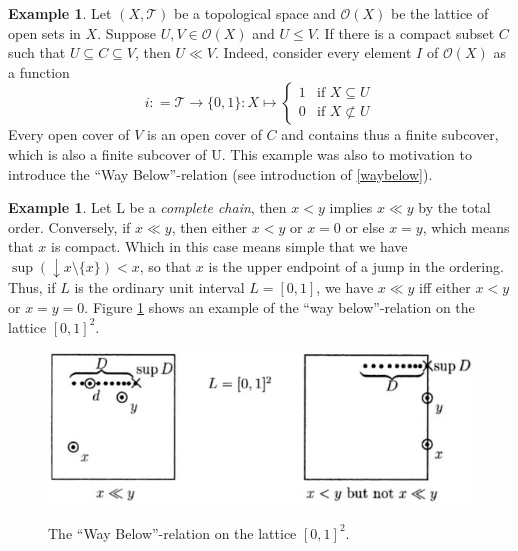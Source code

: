 \documentclass[a4paper,12pt]{article}
\theoremstyle{definition}
\newtheorem{example}[theorem]{Example}
\begin{document}
\begin{example}
Let $(X, \mathcal{T})$ be a topological space and $\mathcal{O}(X)$ be the lattice of open sets in $X$.  Suppose $U,V\in \mathcal{O}(X)$ and $U\le V$.  If there is a compact subset $C$ such that $U\subseteq C \subseteq V$, then $U\ll V$. Indeed, consider every element $I$ of $\mathcal{O}(X)$ as a function
\begin{equation*}
  i: = \mathcal{T} \rightarrow \{0, 1\}: X \mapsto \begin{cases}
    1 & \text{if $X \subseteq U$}\\
    0 & \text{if $X \not\subset U$}
  \end{cases}
\end{equation*}
Every open cover of $V$ is an open cover of $C$ and contains thus a finite subcover, which is also a finite subcover of U. This example was also to motivation to introduce the ``Way Below''-relation (see introduction of \ref{waybelow}).
\end{example}

\begin{example}
Let L be a \emph{complete chain}, then $x < y$ implies $x \ll y$ by the total order. Conversely, if $x \ll y$, then either $x < y$ or $x = 0$ or else $x = y$, which means that $x$ is compact. Which in this case means simple that we have $\sup(\downarrow x\setminus \{x\}) < x$, so that $x$ is the upper endpoint of a jump in the ordering. Thus, if $L$ is the ordinary unit interval $L = [0,1]$, we have $x \ll y$ iff either $x < y$ or $x = y = 0$. Figure \ref{figuurway} shows an example of the ``way below''-relation on the lattice $[0,1]^2$.
\begin{figure}
  \centering
  \includegraphics[scale=0.7]{figuurway.jpg}\\
  \caption{The ``Way Below''-relation on the lattice $[0,1]^2$.}\label{figuurway}
\end{figure}

\end{example}
\end{document}
